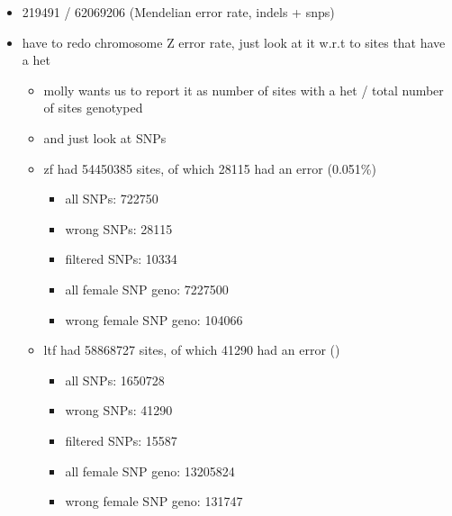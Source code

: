 \documentclass[idxtotoc,hyperref,openany,oneside]{labbook} %
\begin{document}
\begin{itemize}
\item 219491 / 62069206 (Mendelian error rate, indels + snps)
\item have to redo chromosome Z error rate, just look at it w.r.t to sites that have a het
	\begin{itemize}
	\item molly wants us to report it as number of sites with a het / total number of sites genotyped
	\item and just look at SNPs
	\item zf had 54450385 sites, of which 28115 had an error (0.051\%)
		\begin{itemize}
			\item all SNPs: 722750
			\item wrong SNPs: 28115
			\item filtered SNPs: 10334
			\item all female SNP geno: 7227500
			\item wrong female SNP geno: 104066
		\end{itemize}
	\item ltf had 58868727 sites, of which 41290 had an error ()
		\begin{itemize}
			\item all SNPs: 1650728
			\item wrong SNPs: 41290
			\item filtered SNPs: 15587
			\item all female SNP geno: 13205824
			\item wrong female SNP geno: 131747
		\end{itemize}
\end{itemize}
\end{itemize}
\end{document}
